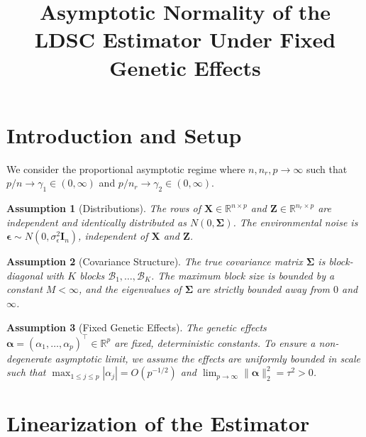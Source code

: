 \documentclass{article}
\title{Asymptotic Normality of the LDSC Estimator Under Fixed Genetic Effects}
\author{}
\date{}
\newcommand{\bbR}{\mathbb{R}}
\newcommand{\X}{\mathbf{X}}
\newcommand{\Z}{\mathbf{Z}}
\newcommand{\I}{\mathbf{I}}
\newcommand{\1}{\mathbf{1}}
\newcommand{\bmSigma}{\boldsymbol{\Sigma}}
\newcommand{\bmalpha}{\boldsymbol{\alpha}}
\newcommand{\bmeps}{\boldsymbol{\epsilon}}
\newtheorem{assumption}{Assumption}
\begin{document}
\maketitle

\section{Introduction and Setup}

We consider the proportional asymptotic regime where $n, n_r, p \to \infty$ such that $p/n \to \gamma_1 \in (0, \infty)$ and $p/n_r \to \gamma_2 \in (0, \infty)$. 

\begin{assumption}[Distributions]
The rows of $\X \in \bbR^{n \times p}$ and $\Z \in \bbR^{n_r \times p}$ are independent and identically distributed as $N(0, \bmSigma)$. The environmental noise is $\bmeps \sim N(0, \sigma_\epsilon^2 \I_n)$, independent of $\X$ and $\Z$.
\end{assumption}

\begin{assumption}[Covariance Structure]
The true covariance matrix $\bmSigma$ is block-diagonal with $K$ blocks $\mathcal{B}_1, \dots, \mathcal{B}_K$. The maximum block size is bounded by a constant $M < \infty$, and the eigenvalues of $\bmSigma$ are strictly bounded away from $0$ and $\infty$. 
\end{assumption}

\begin{assumption}[Fixed Genetic Effects]
The genetic effects $\bmalpha = (\alpha_1, \dots, \alpha_p)^\top \in \bbR^p$ are fixed, deterministic constants. To ensure a non-degenerate asymptotic limit, we assume the effects are uniformly bounded in scale such that $\max_{1 \le j \le p} |\alpha_j| = O(p^{-1/2})$ and $\lim_{p \to \infty} \|\bmalpha\|_2^2 = \tau^2 > 0$.
\end{assumption}

\section{Linearization of the Estimator}
\end{document}
